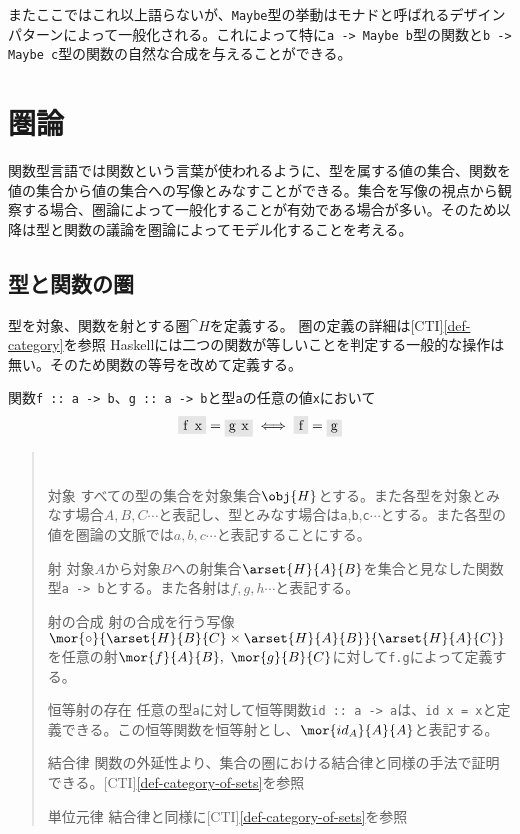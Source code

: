 \documentclass[uplatex,dvipdfmx]{jsarticle}
\newcommand{\pr}[1]{\colorbox[rgb]{0.9,0.9,0.9}{\lstinline{#1}}}
\newcommand{\functype}[2]{\pr{#1 -> #2}}
\newcommand{\refcti}[1]{[CTI]\ref{#1}}
\newcommand{\fpmor}[3]{\pr{#1 :: #2 -> #3}}
\begin{document}
  またここではこれ以上語らないが、\pr{Maybe}型の挙動はモナドと呼ばれるデザインパターンによって一般化される。これによって特に\pr{a -> Maybe b}型の関数と\pr{b -> Maybe c}型の関数の自然な合成を与えることができる。
  \section{圏論}
  関数型言語では関数という言葉が使われるように、型を属する値の集合、関数を値の集合から値の集合への写像とみなすことができる。集合を写像の視点から観察する場合、圏論によって一般化することが有効である場合が多い。そのため以降は型と関数の議論を圏論によってモデル化することを考える。
  \subsection{型と関数の圏}
  型を対象、関数を射とする圏$\cat{H}$を定義する。
  圏の定義の詳細は\refcti{def-category}を参照
  Haskellには二つの関数が等しいことを判定する一般的な操作は無い。そのため関数の等号を改めて定義する。
  \begin{define}[関数の外延性]\label{def-function-extensionality}
    関数\fpmor{f}{a}{b}、\fpmor{g}{a}{b}と型\pr{a}の任意の値\pr{x}において\[\pr{f x}=\pr{g x} \iff \pr{f} = \pr{g}\]
  \end{define}
  \begin{define}[型と関数の圏]\label{def-hask-category}
		\begin{quote}~
			\begin{mydescription}
        \item[対象] すべての型の集合を対象集合$\obj{H}$とする。また各型を対象とみなす場合$A,B,C\cdots$と表記し、型とみなす場合は\pr{a},\pr{b},\pr{c}$\cdots$とする。また各型の値を圏論の文脈では$a,b,c\cdots$と表記することにする。
        \item[射] 対象$A$から対象$B$への射集合$\arset{H}{A}{B}$を集合と見なした関数型\functype{a}{b}とする。また各射は$f,g,h\cdots$と表記する。
        \item[射の合成] 射の合成を行う写像$\mor{\circ}{\arset{H}{B}{C}\times\arset{H}{A}{B}}{\arset{H}{A}{C}}$を任意の射$\mor{f}{A}{B},\ \mor{g}{B}{C}$に対して\pr{f.g}によって定義する。
        \item[恒等射の存在] 任意の型\pr{a}に対して恒等関数\fpmor{id}{a}{a}は、\pr{id x = x}と定義できる。この恒等関数を恒等射とし、$\mor{id_A}{A}{A}$と表記する。
        \item[結合律] 関数の外延性より、集合の圏における結合律と同様の手法で証明できる。\refcti{def-category-of-sets}を参照
        \item[単位元律]結合律と同様に\refcti{def-category-of-sets}を参照
		  \end{mydescription}
		\end{quote}
	\end{define}
\end{document}
